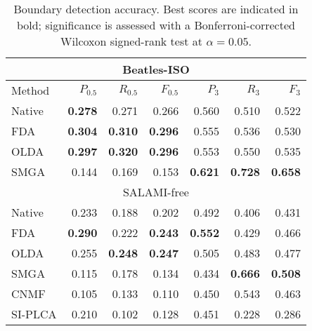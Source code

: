 \begin{table}
\centering
\caption{Boundary detection accuracy. Best scores are indicated in bold; significance is assessed with a Bonferroni-corrected Wilcoxon signed-rank test at $\alpha=0.05$.\label{tab:results}}
\small
\begin{tabular}{lrrrrrr}
\multicolumn{7}{c}{Beatles-ISO}\\
\toprule%
Method & $P_{0.5}$       & $R_{0.5}$         & $F_{0.5}$         & $P_3$             & $R_3$             & $F_3$             \\
\hline
Native  & \textbf{0.278}    & 0.271             & 0.266             & 0.560             & 0.510             & 0.522             \\
FDA     & \textbf{0.304}    & \textbf{0.310}    & \textbf{0.296}    & 0.555             & 0.536             & 0.530             \\
OLDA    & \textbf{0.297}    & \textbf{0.320}    & \textbf{0.296}    & 0.553             & 0.550             & 0.535             \\
\hline
SMGA    & 0.144             & 0.169             & 0.153             & \textbf{0.621}    & \textbf{0.728}    & \textbf{0.658}    \\
\toprule%
\multicolumn{7}{c}{SALAMI-free}\\
\hline
Native  & 0.233             & 0.188             & 0.202             & 0.492             & 0.406             & 0.431             \\
FDA     & \textbf{0.290}    & 0.222             & \textbf{0.243}    & \textbf{0.552}    & 0.429             & 0.466             \\
OLDA    & 0.255             & \textbf{0.248}    & \textbf{0.247}    & 0.505             & 0.483             & 0.477             \\
\hline
SMGA    & 0.115             & 0.178             & 0.134             & 0.434             & \textbf{0.666}    & \textbf{0.508}    \\
CNMF    & 0.105             & 0.133             & 0.110             & 0.450             & 0.543             & 0.463             \\
SI-PLCA & 0.210             & 0.102             & 0.128             & 0.451             & 0.228             & 0.286             \\
\bottomrule%
\end{tabular}
\end{table}
